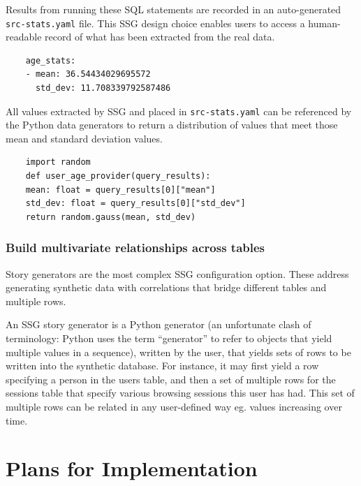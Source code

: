 \documentclass[11pt]{article}
\begin{document}
Results from running these SQL statements are recorded in an auto-generated \texttt{src-stats.yaml} file. This SSG design choice enables users to access a human-readable record of what has been extracted from the real data.

\begin{verbatim}
    age_stats:
    - mean: 36.54434029695572
      std_dev: 11.708339792587486
\end{verbatim}

All values extracted by SSG and placed in \texttt{src-stats.yaml} can be referenced by the Python data generators to return a distribution of values that meet those mean and standard deviation values.

\begin{verbatim}
    import random
    def user_age_provider(query_results):
    mean: float = query_results[0]["mean"]
    std_dev: float = query_results[0]["std_dev"]
    return random.gauss(mean, std_dev)
\end{verbatim}

\subsubsection{Build multivariate relationships across tables}

Story generators are the most complex SSG configuration option. These address generating synthetic data with correlations that bridge different tables and multiple rows.

An SSG story generator is a Python generator (an unfortunate clash of terminology: Python uses the term “generator” to refer to objects that yield multiple values in a sequence), written by the user, that yields sets of rows to be written into the synthetic database. For instance, it may first yield a row specifying a person in the users table, and then a set of multiple rows for the sessions table that specify various browsing sessions this user has had. This set of multiple rows can be related in any user-defined way eg. values increasing over time.


\section{Plans for Implementation}
\end{document}
